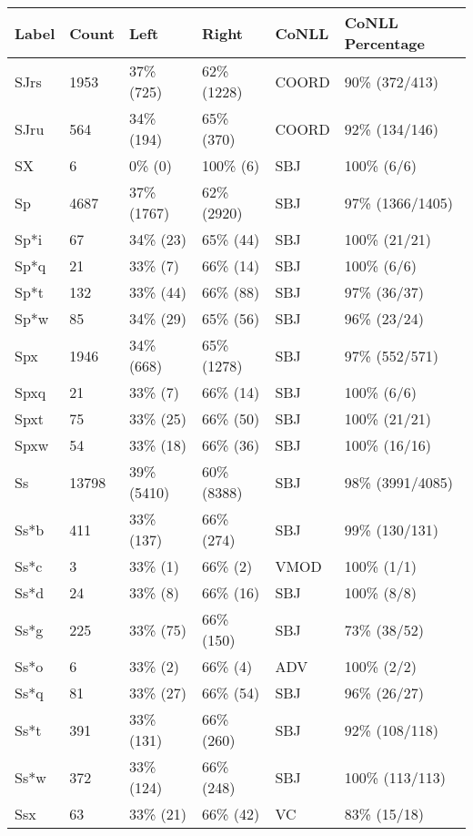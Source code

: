 \begin{figure*}
\begin{tabular}{|l|l|l|l||l|l|}
\hline
Label & Count & Left & Right & CoNLL & CoNLL Percentage\\ 
\hline
 SJrs & 1953 & 37\% (725) & 62\% (1228) & COORD & 90\% (372/413) \\ 
\hline
 SJru & 564 & 34\% (194) & 65\% (370) & COORD & 92\% (134/146) \\ 
\hline
 SX & 6 & 0\% (0) & 100\% (6) & SBJ & 100\% (6/6) \\ 
\hline
 Sp & 4687 & 37\% (1767) & 62\% (2920) & SBJ & 97\% (1366/1405) \\ 
\hline
 Sp*i & 67 & 34\% (23) & 65\% (44) & SBJ & 100\% (21/21) \\ 
\hline
 Sp*q & 21 & 33\% (7) & 66\% (14) & SBJ & 100\% (6/6) \\ 
\hline
 Sp*t & 132 & 33\% (44) & 66\% (88) & SBJ & 97\% (36/37) \\ 
\hline
 Sp*w & 85 & 34\% (29) & 65\% (56) & SBJ & 96\% (23/24) \\ 
\hline
 Spx & 1946 & 34\% (668) & 65\% (1278) & SBJ & 97\% (552/571) \\ 
\hline
 Spxq & 21 & 33\% (7) & 66\% (14) & SBJ & 100\% (6/6) \\ 
\hline
 Spxt & 75 & 33\% (25) & 66\% (50) & SBJ & 100\% (21/21) \\ 
\hline
 Spxw & 54 & 33\% (18) & 66\% (36) & SBJ & 100\% (16/16) \\ 
\hline
 Ss & 13798 & 39\% (5410) & 60\% (8388) & SBJ & 98\% (3991/4085) \\ 
\hline
 Ss*b & 411 & 33\% (137) & 66\% (274) & SBJ & 99\% (130/131) \\ 
\hline
 Ss*c & 3 & 33\% (1) & 66\% (2) & VMOD & 100\% (1/1) \\ 
\hline
 Ss*d & 24 & 33\% (8) & 66\% (16) & SBJ & 100\% (8/8) \\ 
\hline
 Ss*g & 225 & 33\% (75) & 66\% (150) & SBJ & 73\% (38/52) \\ 
\hline
 Ss*o & 6 & 33\% (2) & 66\% (4) & ADV & 100\% (2/2) \\ 
\hline
 Ss*q & 81 & 33\% (27) & 66\% (54) & SBJ & 96\% (26/27) \\ 
\hline
 Ss*t & 391 & 33\% (131) & 66\% (260) & SBJ & 92\% (108/118) \\ 
\hline
 Ss*w & 372 & 33\% (124) & 66\% (248) & SBJ & 100\% (113/113) \\ 
\hline
 Ssx & 63 & 33\% (21) & 66\% (42) & VC & 83\% (15/18) \\ 

\end{tabular}
\end{figure*}
